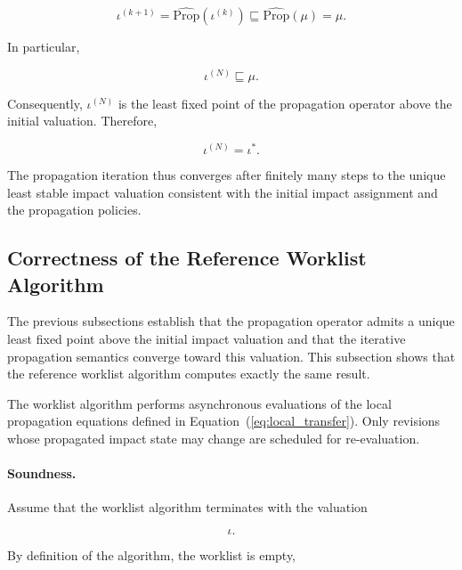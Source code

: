 \documentclass[10pt]{article}
\begin{document}
	\begin{equation}
		\iota^{(k+1)}
		=
		\widehat{\mathrm{Prop}}
		\!\left(
		\iota^{(k)}
		\right)
		\sqsubseteq
		\widehat{\mathrm{Prop}}(\mu)
		=
		\mu.
		\label{eq:minimality_induction_step}
	\end{equation}
	
	In particular,
	
	\begin{equation}
		\iota^{(N)}
		\sqsubseteq
		\mu.
		\label{eq:stabilized_minimality}
	\end{equation}
	
	Consequently, $\iota^{(N)}$ is the least fixed point of the propagation
	operator above the initial valuation. Therefore,
	
	\begin{equation}
		\iota^{(N)}
		=
		\iota^{*}.
		\label{eq:iteration_lfp}
	\end{equation}
	
	The propagation iteration thus converges after finitely many steps to the
	unique least stable impact valuation consistent with the initial impact
	assignment and the propagation policies.
	
	\subsection{Correctness of the Reference Worklist Algorithm}
	
	The previous subsections establish that the propagation operator admits a
	unique least fixed point above the initial impact valuation and that the
	iterative propagation semantics converge toward this valuation. This subsection
	shows that the reference worklist algorithm computes exactly the same result.
	
	The worklist algorithm performs asynchronous evaluations of the local
	propagation equations defined in
	Equation~(\ref{eq:local_transfer}).
	Only revisions whose propagated impact state may change are scheduled for
	re-evaluation.
	
	\paragraph{Soundness.}
	
	Assume that the worklist algorithm terminates with the valuation
	
	\[
	\iota.
	\]
	
	By definition of the algorithm, the worklist is empty,
	
\end{document}
